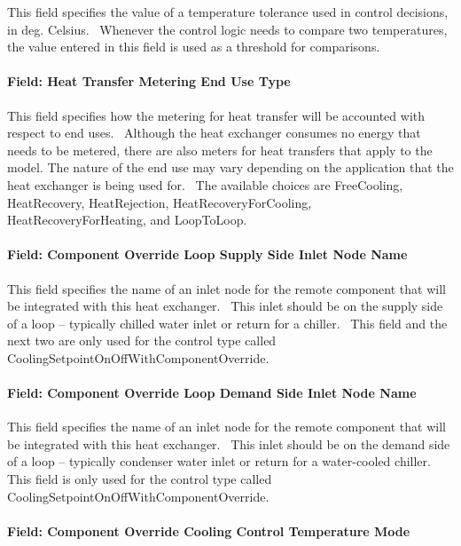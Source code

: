 This field specifies the value of a temperature tolerance used in control decisions, in deg. Celsius.~ Whenever the control logic needs to compare two temperatures, the value entered in this field is used as a threshold for comparisons.

\paragraph{Field: Heat Transfer Metering End Use Type}\label{field-heat-transfer-metering-end-use-type}

This field specifies how the metering for heat transfer will be accounted with respect to end uses.~ Although the heat exchanger consumes no energy that needs to be metered, there are also meters for heat transfers that apply to the model. The nature of the end use may vary depending on the application that the heat exchanger is being used for.~ The available choices are FreeCooling, HeatRecovery, HeatRejection, HeatRecoveryForCooling, HeatRecoveryForHeating, and LoopToLoop.

\paragraph{Field: Component Override Loop Supply Side Inlet Node Name}\label{field-component-override-loop-supply-side-inlet-node-name}

This field specifies the name of an inlet node for the remote component that will be integrated with this heat exchanger.~ This inlet should be on the supply side of a loop -- typically chilled water inlet or return for a chiller.~ This field and the next two are only used for the control type called CoolingSetpointOnOffWithComponentOverride.

\paragraph{Field: Component Override Loop Demand Side Inlet Node Name}\label{field-component-override-loop-demand-side-inlet-node-name}

This field specifies the name of an inlet node for the remote component that will be integrated with this heat exchanger.~ This inlet should be on the demand side of a loop -- typically condenser water inlet or return for a water-cooled chiller.~ This field is only used for the control type called CoolingSetpointOnOffWithComponentOverride.

\paragraph{Field: Component Override Cooling Control Temperature Mode}\label{field-component-override-cooling-control-temperature-mode}

